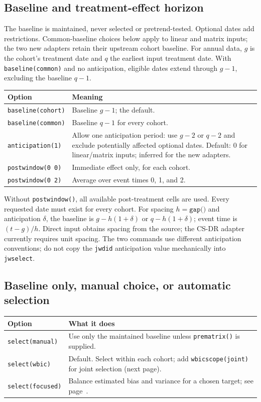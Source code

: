 \documentclass[11pt]{article}
\newcommand{\cmd}[1]{\texttt{#1}}
\begin{document}
\subsection*{Baseline and treatment-effect horizon}
The baseline is maintained, never selected or pretrend-tested. Optional dates add restrictions.
Common-baseline choices below apply to linear and matrix inputs; the two new
adapters retain their upstream cohort baseline.
For annual data, $g$ is the cohort's treatment date and $q$ the earliest input treatment date.
With \cmd{baseline(common)} and no anticipation, eligible dates extend through $g-1$,
excluding the baseline $q-1$.

\begin{tabularx}{\linewidth}{@{}p{.38\linewidth}Y@{}}
\toprule
Option & Meaning \\
\midrule
\cmd{baseline(cohort)} & Baseline $g-1$; the default. \\
\cmd{baseline(common)} & Baseline $q-1$ for every cohort. \\
\cmd{anticipation(1)} & Allow one anticipation period: use $g-2$ or $q-2$ and exclude potentially affected optional dates. Default: 0 for linear/matrix inputs; inferred for the new adapters. \\
\cmd{postwindow(0 0)} & Immediate effect only, for each cohort. \\
\cmd{postwindow(0 2)} & Average over event times 0, 1, and 2. \\
\bottomrule
\end{tabularx}

Without \cmd{postwindow()}, all available post-treatment cells are used.
Every requested date must exist for every cohort. For spacing $h=\cmd{gap()}$
and anticipation $\delta$, the baseline is $g-h(1+\delta)$ or $q-h(1+\delta)$;
event time is $(t-g)/h$. Direct input obtains spacing from the source; the
CS-DR adapter currently requires unit spacing.
The two commands use different anticipation conventions; do not copy the
\cmd{jwdid} anticipation value mechanically into \cmd{jwselect}.

\subsection*{Baseline only, manual choice, or automatic selection}
\begin{tabularx}{\linewidth}{@{}p{.38\linewidth}Y@{}}
\toprule
Option & What it does \\
\midrule
\cmd{select(manual)} & Use only the maintained baseline unless \cmd{prematrix()} is supplied. \\
\cmd{select(wbic)} & Default. Select within each cohort; add \cmd{wbicscope(joint)} for joint selection (next page). \\
\cmd{select(focused)} & Balance estimated bias and variance for a chosen target; see page~\pageref{sec:focused}. \\
\bottomrule
\end{tabularx}
\end{document}
